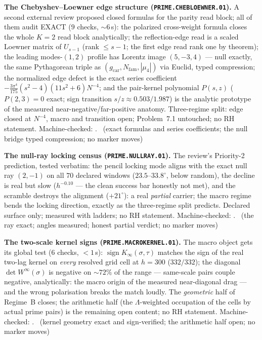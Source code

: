 \documentclass[11pt,a4paper]{article}
\newcommand{\gcar}{g_{\mathrm{car}}}
\newcommand{\Nfam}{N_{\mathrm{fam}}}
\theoremstyle{definition}
\begin{document}
\par\smallskip\noindent\textbf{The Chebyshev--Loewner edge structure
(\texttt{PRIME.CHEBLOEWNER.01}).}
A second external review proposed closed formulas for the parity read
block; all of them audit EXACT ($9$ checks, ${\sim}6$\,s): the polarized
cross-weight formula closes the whole $K=2$ read block analytically; the
reflection-edge read is a scaled Loewner matrix of $U_{s-1}$ (rank
$\le s-1$; the first edge read rank one by theorem); the leading
modes-$(1,2)$ profile has Lorentz image $(5,-3,4)$ --- null exactly, the
same Pythagorean triple as $(\gcar,\Nfam,|\mu_4|)$ via Euclid, typed
compression; the normalized edge defect is the exact series coefficient
$-\tfrac{3\pi^4}{175}(s^2{-}4)(11s^2{+}6)N^{-4}$; and the pair-kernel
polynomial $P(s,z)$ ($P(2,3)=0$ exact; sign transition
$s/z\approx0.503/1.987$) is the analytic prototype of the measured
near-negative/far-positive anatomy. Three-regime split: edge closed at
$N^{-4}$, macro and transition open; Problem~7.1 untouched; no RH
statement. Machine-checked: .
\mE\ (exact formulas and series coefficients; the null bridge typed
compression; no marker moves)
\par\smallskip

\par\smallskip\noindent\textbf{The null-ray locking census
(\texttt{PRIME.NULLRAY.01}).}
The review's Priority-2 prediction, tested verbatim: the pencil locking
mode aligns with the exact null ray $(2,-1)$ on all $70$ declared windows
($23.5$--$33.8^\circ$, below random), the decline is real but slow
($h^{-0.10}$ --- the clean success bar honestly not met), and the
scramble destroys the alignment ($+21^\circ$): a real \emph{partial}
carrier; the macro regime bends the locking direction, exactly as the
three-regime split predicts. Declared surface only; measured with
ladders; no RH statement. Machine-checked:
.
\mE\ (the ray exact; angles measured; honest partial verdict; no marker
moves)
\par\smallskip

\par\smallskip\noindent\textbf{The two-scale kernel signs
(\texttt{PRIME.MACROKERNEL.01}).}
The macro object gets its global test ($6$ checks, ${<}1$\,s):
$\operatorname{sign}K_\infty(\sigma,\tau)$ matches the sign of the real
two-lag kernel on \emph{every} resolved grid cell at $h=300$ ($332/332$);
the diagonal $\det W^\infty(\sigma)$ is negative on ${\sim}72\%$ of the
range --- same-scale pairs couple negative, analytically: the macro
origin of the measured near-diagonal drag --- and the wrong polarisation
breaks the match loudly. The \emph{geometric} half of Regime~B closes;
the arithmetic half (the $\Lambda$-weighted occupation of the cells by
actual prime pairs) is the remaining open content; no RH statement.
Machine-checked: .
\mE\ (kernel geometry exact and sign-verified; the arithmetic half open;
no marker moves)
\par\smallskip
\end{document}
